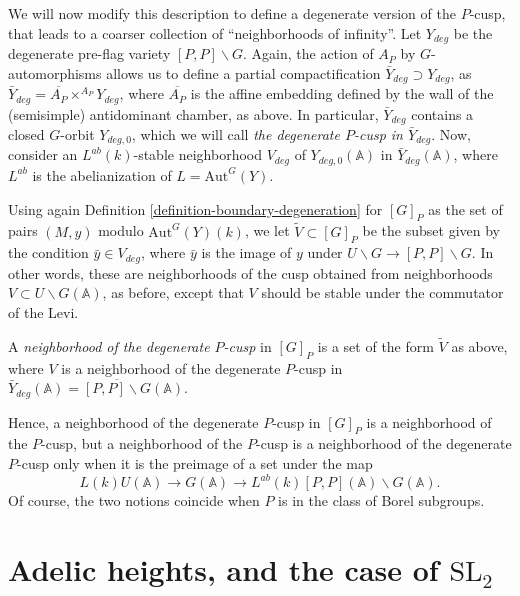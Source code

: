 We will now modify this description to define a degenerate version of the $P$-cusp, that leads to a coarser collection of ``neighborhoods of infinity''. Let $Y_{deg}$ be the degenerate pre-flag variety $[P,P]\backslash G$. Again, the action of $A_P$ by $G$-automorphisms allows us to define a partial compactification $\bar Y_{deg}\supset Y_{deg}$, as $\bar Y_{deg} = \overline{A_P} \times^{A_P} Y_{deg}$, where $\overline{A_P}$ is the affine embedding defined by the wall of the (semisimple) antidominant chamber, as above. In particular, $\bar Y_{deg}$ contains a closed $G$-orbit $Y_{deg,0}$, which we will call \emph{the degenerate $P$-cusp in $\bar Y_{deg}$}. Now, consider an $L^{ab}(k)$-stable neighborhood $V_{deg}$ of $Y_{deg,0}(\mathbb A)$ in $\bar Y_{deg}(\mathbb A)$, where $L^{ab}$ is the abelianization of $L=\text{Aut}^G(Y)$.

Using again Definition \ref{definition-boundary-degeneration} for $[G]_P$ as the set of pairs $(M,y)$ modulo $\text{Aut}^G(Y)(k)$, we let $\tilde V\subset [G]_P$ be the subset given by the condition $\bar y\in V_{deg}$, where $\bar y$ is the image of $y$ under $U\backslash G\to [P,P]\backslash G$. In other words, these are neighborhoods of the cusp obtained from neighborhoods $V\subset U\backslash G(\mathbb A)$, as before, except that $V$ should be stable under the commutator of the Levi. 

\begin{definition}
 \label{definition-degenerate-P-cusp}
 A {\it neighborhood of the degenerate $P$-cusp} in $[G]_P$ is a set of the form $\tilde V$ as above, where $V$ is a neighborhood of the degenerate $P$-cusp in $\bar Y_{deg}(\mathbb A) = \overline{[P,P]\backslash G}(\mathbb A)$.
\end{definition}

Hence, a neighborhood of the degenerate $P$-cusp in $[G]_P$ is a neighborhood of the $P$-cusp, but a neighborhood of the $P$-cusp is a neighborhood of the degenerate $P$-cusp only when it is the preimage of a set under the map 
$$ L(k)U(\mathbb A)\to G(\mathbb A) \to L^{ab}(k)[P,P](\mathbb A)\backslash G(\mathbb A).$$
Of course, the two notions coincide when $P$ is in the class of Borel subgroups.

\section{Adelic heights, and the case of $\text{SL}_2$}
\label{section-adelic-heights}


